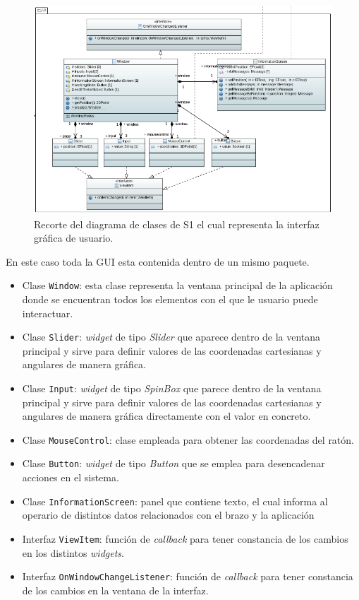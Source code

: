 \begin{figure}[H]
    \centering
    \includegraphics[width=\linewidth]{pictures/S1ClassDiagramGUI.PNG}
    \caption{Recorte del diagrama de clases de \ac{S1} el cual representa la interfaz gráfica de usuario.}
    \label{fig:diagrama_clases_GUI_s1}
\end{figure}

En este caso toda la GUI esta contenida dentro de un mismo paquete.

\begin{itemize}
    \item Clase \texttt{Window}: esta clase representa la ventana principal de la aplicación donde se encuentran todos los elementos con el que le usuario puede interactuar.
    \item Clase \texttt{Slider}: \textit{widget} de tipo \textit{Slider} que aparece dentro de la ventana principal y sirve para definir valores de las coordenadas cartesianas y angulares de manera gráfica.
    \item Clase \texttt{Input}: \textit{widget} de tipo \textit{SpinBox} que parece dentro de la ventana principal y sirve para definir valores de las coordenadas cartesianas y angulares de manera gráfica directamente con el valor en concreto.
    \item Clase \texttt{MouseControl}: clase empleada para obtener las coordenadas del ratón.
    \item Clase \texttt{Button}: \textit{widget} de tipo \textit{Button} que se emplea para desencadenar acciones en el sistema.
    \item Clase \texttt{InformationScreen}: panel que contiene texto, el cual informa al operario de distintos datos relacionados con el brazo y la aplicación
    \item Interfaz \texttt{ViewItem}: función de \textit{callback} para tener constancia de los cambios en los distintos \textit{widgets}.
    \item Interfaz \texttt{OnWindowChangeListener}: función de \textit{callback} para tener constancia de los cambios en la ventana de la interfaz.
\end{itemize}


